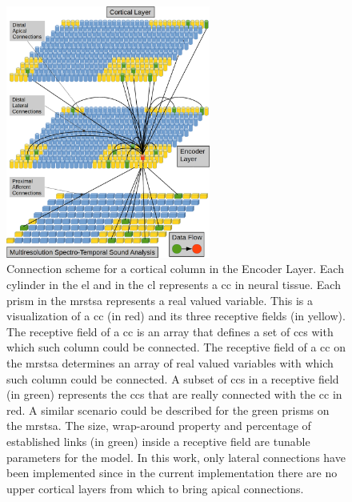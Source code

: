\documentclass[10pt,letterpaper]{article}
\begin{document}
\begin{figure}[h!]
    \centering
    \includegraphics[width=0.6\textwidth]{EncoderColumnConnections.png}
    \caption{Connection scheme for a cortical column in the Encoder Layer.
	    Each cylinder in the \gls{el} and in the \gls{cl} represents a \gls{cc} in neural tissue.
	    Each prism in the \gls{mrstsa} represents a real valued variable.
	    This is a visualization of a \gls{cc} (in red) and its three receptive fields (in yellow).
	    The receptive field of a \gls{cc} is an array that defines a set of \glspl{cc}
	    with which such column could be connected.
	    The receptive field of a \gls{cc} on the \gls{mrstsa} determines an array of real valued variables
	    with which such column could be connected.
    A subset of \glspl{cc} in a receptive field (in green) represents the \glspl{cc} that are really
    connected with the \gls{cc} in red. A similar scenario could be described for the green prisms on
    the \gls{mrstsa}.
    The size, wrap-around property and percentage of established links (in green) inside a receptive field are tunable parameters for the model.
    In this work, only lateral connections have been implemented since in the current implementation there are no upper cortical layers from which
    to bring apical connections.}
    \label{fig:EncoderColumnConnections}
\end{figure}
\end{document}
